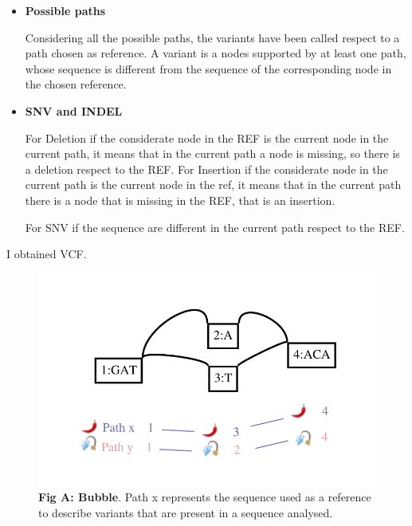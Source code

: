 \begin{itemize}
\item\textbf{Possible paths}

Considering all the possible paths, the variants have been called respect to a path chosen as reference. A variant is a nodes supported by at least one path, whose sequence is different from the sequence of the corresponding node in the chosen reference.

\item\textbf{SNV and INDEL}

For Deletion if the considerate node in the REF is the current node in the current path, it means that in the current path a node is missing, so there is a deletion respect to the REF.
For Insertion if the considerate node in the current path is the current node in the ref, it means that in the current path there is a node that is missing in the REF, that is an insertion.

For SNV if the sequence are different in the current path respect to the REF.
\end{itemize}

I obtained VCF.


\begin{figure}[H]
\centering
\includegraphics[width=1.10\textwidth]{fig/GraphchrXnew.pdf}
\decoRule
\caption{\textbf{Fig A: Bubble}. Path x represents the sequence used as a reference to describe variants that are present in a sequence analysed.} %
\label{fig:bubble.png}
\end{figure}

